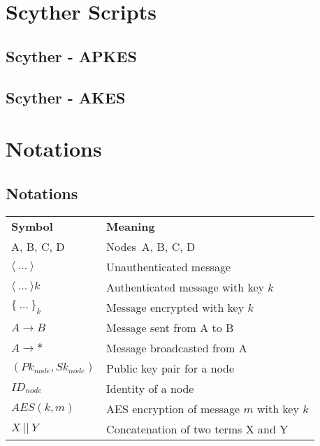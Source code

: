 \chapter{Scyther Scripts}
\label{app:listings}


\section{Scyther - APKES}
\label{app:apkes}



\section{Scyther - AKES}
\label{app:akes}




\chapter{Notations}

\section{Notations}
\label{app:notations}

\begin{tcolorbox}[title=Notations used in protocol specifications]
\begin{tabular}{ll}
\multicolumn{1}{p{1.3cm}}{\textbf{Symbol}} & \multicolumn{1}{p{4cm}}{\textbf{Meaning}}\\
A, B, C, D & Nodes\ A, B, C, D\\
$\langle{\ ...\ }\rangle{}$ & Unauthenticated message\\
$\langle{\ ...\ }\rangle{k}$ & Authenticated message with key $k$\\
$\{\ ...\ \}_k$ & Message encrypted with key $k$\\
$A \rightarrow B$ & Message sent from A to B\\
$A \rightarrow *$ & Message broadcasted from A\\
$(Pk_{node}, Sk_{node})$ & Public key pair for a node \\
$ID_{node}$ & Identity of a node\\
$AES(k, m)$ & AES encryption of message $m$ with key $k$\\
$X\ ||\ Y$ & Concatenation of two terms X and Y\\ 
\end{tabular}
\end{tcolorbox}


